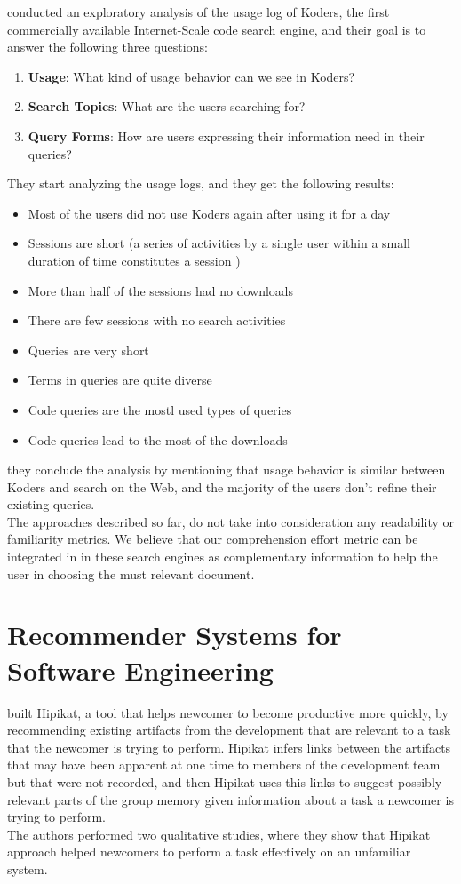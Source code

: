 \documentclass[12pt,mscthesis]{usiinfthesis}
\begin{document}
	
	\citet{Bajracharya2012} conducted an exploratory analysis of the usage log of Koders, the first commercially available Internet-Scale code search engine, and their goal is to answer the following three questions:\\
	\begin{enumerate}
	\item \textbf{Usage}: What kind of usage behavior can we see in Koders?
	\item \textbf{Search Topics}: What are the users searching for?
	\item \textbf{Query Forms}: How are users expressing their information need in their queries?
	\end{enumerate}
	They start analyzing the usage logs, and they get the following results: 
	\begin{itemize}
	\item Most of the users did not use Koders again after using it for a day
	\item Sessions are short (a series of activities by a single user within a small duration of time constitutes a session )
	\item More than half of the sessions had no downloads
	\item There are few sessions with no search activities
	\item Queries are very short
	\item Terms in queries are quite diverse
	\item Code queries are the mostl used types of queries
	\item Code queries lead to the most of the downloads
	\end{itemize}
	they conclude the analysis by mentioning that usage behavior is similar between Koders and search on the Web, and the majority of the users don't refine their existing queries.\\

	The approaches described so far, do not take into consideration any readability or familiarity metrics. We believe that our comprehension effort metric can be integrated in in these search engines as complementary information to help the user in choosing the must relevant document.
	
	\section{Recommender Systems for Software Engineering}

	\citet{Cubranic:2003:HRP:776816.776866} built Hipikat, a tool that helps newcomer to become productive more quickly, by recommending existing artifacts from the development that are relevant to a task that the newcomer is trying to perform. Hipikat infers links between the artifacts that may have been apparent at one time to members of the development team but that were not recorded, and then Hipikat uses this links to suggest possibly relevant parts of the group memory given information about a task a newcomer is trying to perform.\\
	The authors performed two qualitative studies, where they show that Hipikat approach helped newcomers to perform a task effectively on an unfamiliar system.\\
\end{document}
